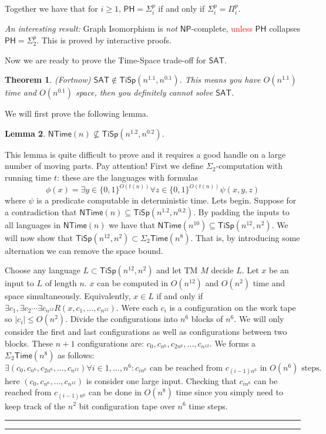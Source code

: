 \documentclass[twoside]{article}
\newcounter{lecnum}
\newtheorem{theorem}{Theorem}[lecnum]
\newtheorem{lemma}[theorem]{Lemma}
\newenvironment{proof}{{\bf Proof:}}{\hfill\rule{2mm}{2mm}}
\def\NP{\mathsf{NP}}
\def\PH{\mathsf{PH}}
\def\Time{\mathsf{Time}}
\def\SAT{\mathsf{SAT}}
\def\NTime{\mathsf{NTime}}
\def\TiSp{\mathsf{TiSp}}
\begin{document}
Together we have that for $i \geq 1$, $\PH = \Sigma^p_i$ if and only if $\Sigma^p_i = \Pi^p_i$.

\emph{An interesting result:} Graph Isomorphism is \emph{not} $\NP$-complete, \textcolor{red}{unless} $\PH$ collapses $\PH = \Sigma_{2}^{p}$. This is proved by interactive proofs. 

Now we are ready to prove the Time-Space trade-off for $\SAT$. 
\begin{theorem}
(Fortnow) $\SAT \notin \TiSp (n^{1.1}, n^{0.1})$. This means you have $O(n^{1.1})$ time and $O(n^{0.1})$ space, then you definitely cannot solve $\SAT$.
\end{theorem}
\begin{proof}
We will first prove the following lemma. 
\begin{lemma}
$\NTime (n) \not\subseteq \TiSp (n^{1.2}, n^{0.2})$.
\end{lemma}
\begin{proof}
This lemma is quite difficult to prove and it requires a good handle on a large number of moving parts. Pay attention! First we define $\Sigma_2$-computation with running time $t$: these are the languages with formulas
\[\phi(x) = \exists y \in \{0,1\}^{O(t(n))}\forall z \in \{0,1\}^{O(t(n))}\psi(x,y,z)\]
where $\psi$ is a predicate computable in deterministic time. Lets begin. Suppose for a contradiction that $\NTime(n) \subseteq \TiSp(n^{1.2}, n^{0.2})$. By padding the inputs to all languages in $\NTime(n)$ we have that $\NTime(n^{10}) \subseteq \TiSp(n^{12}, n^{2})$. We will now show that $\TiSp(n^{12}, n^{2}) \subset \Sigma_2 \Time(n^8)$. That is, by introducing some alternation we can remove the space bound. 

Choose any language $L \subset \TiSp(n^{12}, n^{2})$ and let TM $M$ decide $L$. Let $x$ be an input to $L$ of length $n$. $x$ can be computed in $O(n^{12})$ and $O(n^2)$ time and space simultaneously. Equivalently, $x \in L$ if and only if $\exists c_1, \exists c_2 \cdots \exists c_{n^{12}} R(x, c_1, ..., c_{n^{12}})$. Were each $c_i$ is a configuration on the work tape so $|c_i| \leq O(n^2)$. Divide the configurations into $n^6$ blocks of $n^6$. We will only consider the first and last configurations as well as configurations between two blocks. These $n+1$ configurations are: $c_0, c_{n^6}, c_{2n^6}, ..., c_{n^{12}}$. We forms a $\Sigma_2 \Time (n^8)$ as follows: 
\[\exists (c_0, c_{n^6}, c_{2n^6}, ..., c_{n^{12}}) \forall i \in {1, ..., n^{6}}: c_{in^6} \mbox{ can be reached from } c_{(i-1)n^6} \mbox{ in } O(n^6) \mbox{ steps.} \]
here $(c_0, c_{n^6}, ..., c_{n^{12}})$ is consider one large input. Checking that $c_{in^6}$ can be reached from $c_{(i-1)n^6}$ can be done in $O(n^{8})$ time since you simply need to keep track of the $n^2$ bit configuration tape over $n^6$ time steps. 


\end{proof}
\end{proof}
\end{document}

